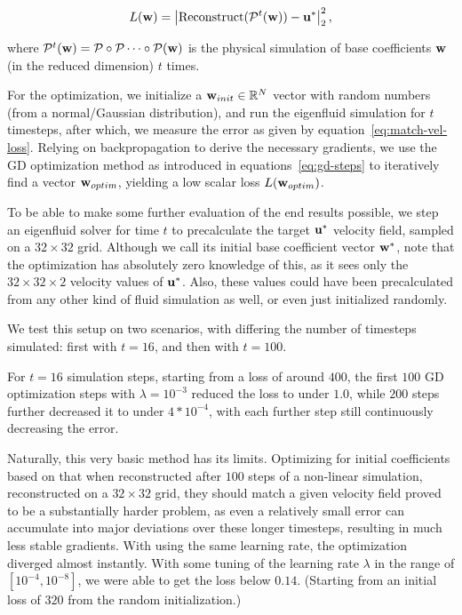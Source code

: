 \begin{equation}\label{eq:match-vel-loss}
  L(\vb{w}) = \left|
  \text{Reconstruct}(\mathcal{P}^{t}(\vb{w})) - \vb{u}^*
  \right|_2^2,
\end{equation}

where $\mathcal{P}^t(\vb{w}) = \mathcal{P} \circ \mathcal{P} \dots \circ
\mathcal{P}(\vb{w})$ is the physical simulation of base coefficients $\vb{w}$
(in the reduced dimension) $t$ times.

For the optimization, we initialize a $\vb{w}_{init} \in \mathbb{R}^N$
vector with random numbers (from a normal/Gaussian distribution), and run the
eigenfluid simulation for $t$ timesteps, after which, we measure the error as
given by equation~\eqref{eq:match-vel-loss}. Relying on backpropagation to
derive the necessary gradients, we use the \ac{GD} optimization method as
introduced in equations~\eqref{eq:gd-steps} to iteratively find a vector
$\vb{w}_{optim}$, yielding a low scalar loss $L(\vb{w}_{optim})$.

To be able to make some further evaluation of the end results possible, we step
an eigenfluid solver for time $t$ to precalculate the target $\vb{u}^*$
velocity field, sampled on a $32\times32$ grid. Although we call its initial
base coefficient vector $\vb{w}^*$, note that the optimization has absolutely
zero knowledge of this, as it sees only the $32\times32\times2$ velocity values
of $\vb{u}^*$. Also, these values could have been precalculated from any other
kind of fluid simulation as well, or even just initialized randomly.

We test this setup on two scenarios, with differing the number of timesteps
simulated: first with $t=16$, and then with $t=100$.

For $t=16$ simulation steps, starting from a loss of around $400$, the first
$100$ \ac{GD} optimization steps with $\lambda=10^{-3}$ reduced the loss to
under $1.0$, while $200$ steps further decreased it to under $4*10^{-4}$, with
each further step still continuously decreasing the error. 

Naturally, this very basic method has its limits.  Optimizing for initial
coefficients based on that when reconstructed after $100$ steps of a non-linear
simulation, reconstructed on a $32\times32$ grid, they should match a given
velocity field proved to be a substantially harder problem, as even a relatively
small error can accumulate into major deviations over these longer timesteps,
resulting in much less stable gradients.  With using the same learning rate, the
optimization diverged almost instantly. With some tuning of the learning rate
$\lambda$ in the range of $[10^{-4}, 10^{-8}]$, we were able to get the loss
below $0.14$. (Starting from an initial loss of $320$ from the random
initialization.) 

